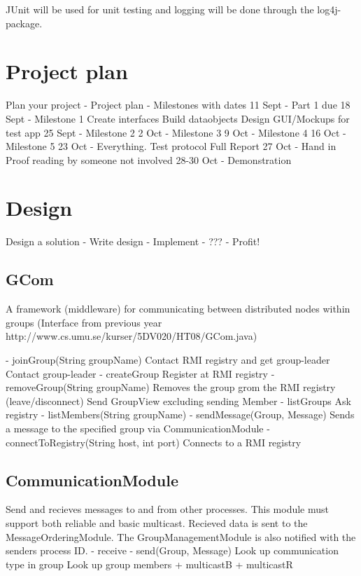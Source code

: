 \documentclass[11pt,swedish]{article}
\begin{document}
JUnit will be used for unit testing and logging will be done through the log4j-package. 

\section{Project plan}
Plan your project
- Project plan
- Milestones with dates
	11 Sept		- Part 1 due
	18 Sept		- Milestone 1
					Create interfaces
					Build dataobjects
					Design GUI/Mockups for test app
	25 Sept		- Milestone 2
	2 Oct		- Milestone 3
	9 Oct		- Milestone 4
	16 Oct		- Milestone 5
	23 Oct		- Everything.
		Test protocol
		Full Report
	27 Oct 		- Hand in
		Proof reading by someone not involved
	28-30 Oct 	- Demonstration

\section{Design}
Design a solution
- Write design
- Implement
- ???
- Profit!


\subsection{GCom}
A framework (middleware) for communicating between distributed nodes within groups
	(Interface from previous year http://www.cs.umu.se/kurser/5DV020/HT08/GCom.java)

- joinGroup(String groupName)
	Contact RMI registry and get group-leader
	Contact group-leader
- createGroup
	Register at RMI registry
- removeGroup(String groupName)
	Removes the group grom the RMI registry
(leave/disconnect)
	Send GroupView excluding sending Member
- listGroups
	Ask registry
- listMembers(String groupName)
- sendMessage(Group, Message)
	Sends a message to the specified group via CommunicationModule
- connectToRegistry(String host, int port)
	Connects to a RMI registry


\subsection{CommunicationModule}
Send and recieves messages to and from other processes. This module must support both reliable and basic multicast. Recieved data is sent to the MessageOrderingModule. The GroupManagementModule is also notified with the senders process ID. 
- receive
- send(Group, Message)
	Look up communication type in group
	Look up group members
+ multicastB
+ multicastR
\end{document}
